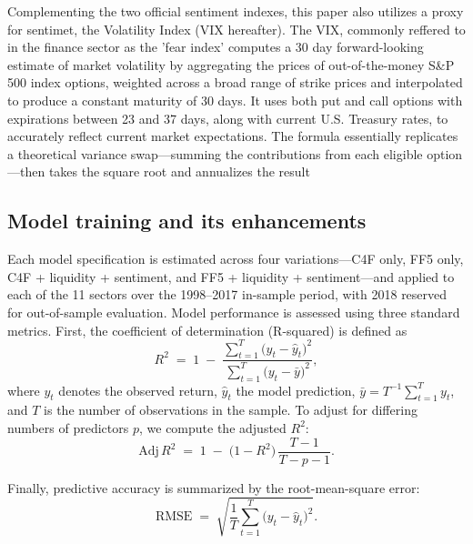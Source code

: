 Complementing the two official sentiment indexes, this paper also utilizes a proxy for sentimet, the Volatility Index (VIX hereafter). The VIX, commonly reffered to in the finance sector as the 'fear index' computes a 30 day forward-looking estimate of market volatility by aggregating the prices of out-of-the-money S\&P 500 index options, weighted across a broad range of strike prices and interpolated to produce a constant maturity of 30 days. It uses both put and call options with expirations between 23 and 37 days, along with current U.S. Treasury rates, to accurately reflect current market expectations. The formula essentially replicates a theoretical variance swap—summing the contributions from each eligible option—then takes the square root and annualizes the result 

 
\subsection{Model training and its enhancements}

Each model specification is estimated across four variations—C4F only, FF5 only, C4F + liquidity + sentiment, and FF5 + liquidity + sentiment—and applied to each of the 11 sectors over the 1998–2017 in-sample period, with 2018 reserved for out-of-sample evaluation.  Model performance is assessed using three standard metrics.  First, the coefficient of determination (R-squared) is defined as  
\begin{equation}
\label{eq:rsquared}
R^2 \;=\; 1 \;-\; \frac{\sum_{t=1}^{T}\bigl(y_{t}-\hat y_{t}\bigr)^2}{\sum_{t=1}^{T}\bigl(y_{t}-\bar y\bigr)^2},
\end{equation}  
where \(y_t\) denotes the observed return, \(\hat y_t\) the model prediction, \(\bar y = T^{-1}\sum_{t=1}^T y_t\), and \(T\) is the number of observations in the sample.  To adjust for differing numbers of predictors \(p\), we compute the adjusted \(R^2\):  
\begin{equation}
\label{eq:adjrsquared}
\mathrm{Adj}\,R^2 \;=\; 1 \;-\; \bigl(1 - R^2\bigr)\,\frac{T - 1}{T - p - 1}.
\end{equation}  

Finally, predictive accuracy is summarized by the root-mean-square error:  
\begin{equation}
\label{eq:rmse}
\mathrm{RMSE} \;=\; \sqrt{\frac{1}{T}\sum_{t=1}^{T}\bigl(y_{t}-\hat y_{t}\bigr)^2}.
\end{equation}  

